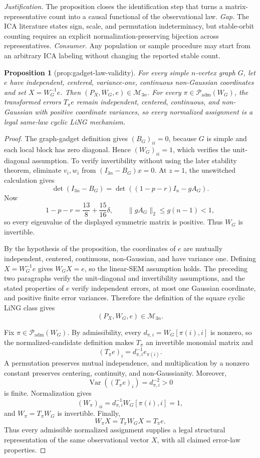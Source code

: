 \documentclass{article}
\newtheorem{proposition}{Proposition}
\begin{document}
\par\smallskip\noindent \textit{Justification.} The proposition closes the identification step that turns a matrix-representative count into a causal functional of the observational law. \textit{Gap.} The ICA literature states sign, scale, and permutation indeterminacy, but stable-orbit counting requires an explicit normalization-preserving bijection across representatives. \textit{Consumer.} Any population or sample procedure may start from an arbitrary ICA labeling without changing the reported stable count.

\begin{proposition}[prop:gadget-law-validity]\label{prop:gadget-law-validity}
For every simple \(n\)-vertex graph \(G\), let \(e\) have independent, centered, variance-one, continuous non-Gaussian coordinates and set \(X=W_G^{-1}e\). Then \((P_X,W_G,e)\in\mathcal M_{3n}\). For every \(\pi\in\mathcal P_{\mathrm{adm}}(W_G)\), the transformed errors \(T_\pi e\) remain independent, centered, continuous, and non-Gaussian with positive coordinate variances, so every normalized assignment is a legal same-law cyclic LiNG mechanism.
\end{proposition}
\begin{proof}
The graph-gadget definition gives \((B_G)_{ii}=0\), because \(G\) is simple and each local block has zero diagonal. Hence \((W_G)_{ii}=1\), which verifies the unit-diagonal assumption. To verify invertibility without using the later stability theorem, eliminate \(v_i,w_i\) from \((I_{3n}-B_G)x=0\). At \(z=1\), the unswitched calculation gives
\[
 \det(I_{3n}-B_G)
 =\det\!\left(\left(1-p-r\right)I_n-gA_G\right).
\]
Now
\[
 1-p-r=\frac{13}{8}+\frac{15}{16}\delta,
 \qquad \|gA_G\|_2\leq g(n-1)<1,
\]
so every eigenvalue of the displayed symmetric matrix is positive. Thus \(W_G\) is invertible.

By the hypothesis of the proposition, the coordinates of \(e\) are mutually independent, centered, continuous, non-Gaussian, and have variance one. Defining \(X=W_G^{-1}e\) gives \(W_GX=e\), so the linear-SEM assumption holds. The preceding two paragraphs verify the unit-diagonal and invertibility assumptions, and the stated properties of \(e\) verify independent errors, at most one Gaussian coordinate, and positive finite error variances. Therefore the definition of the square cyclic LiNG class gives
\[
 (P_X,W_G,e)\in\mathcal M_{3n}.
\]

Fix \(\pi\in\mathcal P_{\mathrm{adm}}(W_G)\). By admissibility, every \(d_{\pi,i}=W_G[\pi(i),i]\) is nonzero, so the normalized-candidate definition makes \(T_\pi\) an invertible monomial matrix and
\[
 (T_\pi e)_i=d_{\pi,i}^{-1}e_{\pi(i)}.
\]
A permutation preserves mutual independence, and multiplication by a nonzero constant preserves centering, continuity, and non-Gaussianity. Moreover,
\[
 \operatorname{Var}((T_\pi e)_i)=d_{\pi,i}^{-2}>0
\]
is finite. Normalization gives
\[
 (W_\pi)_{ii}=d_{\pi,i}^{-1}W_G[\pi(i),i]=1,
\]
and \(W_\pi=T_\pi W_G\) is invertible. Finally,
\[
 W_\pi X=T_\pi W_GX=T_\pi e.
\]
Thus every admissible normalized assignment supplies a legal structural representation of the same observational vector \(X\), with all claimed error-law properties.
\end{proof}
\end{document}
